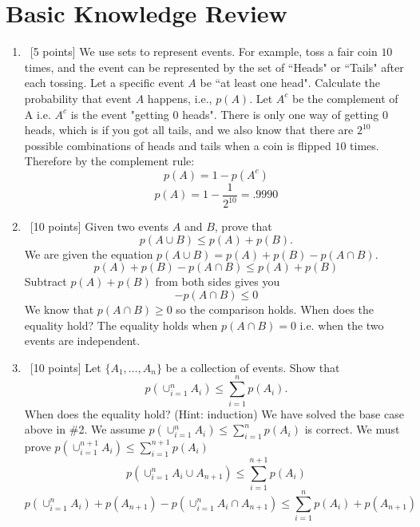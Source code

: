 \documentclass[12pt, fullpage,letterpaper]{article}
\begin{document}
\section*{Basic Knowledge Review}
\label{sec:q1}
\begin{enumerate}
\item~[5 points] We use sets to represent events. For example, toss a fair coin $10$ times, and the event can be represented by the set of ``Heads" or ``Tails" after each tossing. Let a specific event $A$ be ``at least one head". Calculate the probability that event $A$ happens, i.e., $p(A)$.
\newline\newline
Let $A^c$ be the complement of A i.e. $A^c$ is the event "getting 0 heads".  There is only one way of getting 0 heads, which is if you got all tails, and we also know that there are $2^{10}$ possible combinations of heads and tails when a coin is flipped $10$ times.  Therefore by the complement rule:\newline
\[p(A) = 1 - p(A^c)\]\newline
\[p(A) = 1 - \frac{1}{2^{10}} = .9990\]
\newline
\newline
\item~[10 points] Given two events $A$ and $B$, prove that 
\[
p(A \cup B) \le p(A) + p(B).
\]
\newline
We are given the equation $p(A \cup B) = p(A) + p(B) - p(A \cap B)$. \[
p(A) + p(B) - p(A \cap B) \le p(A) + p(B)
\]
Subtract $p(A) + p(B)$ from both sides gives you
\[
-p(A \cap B) \le 0
\]
We know that $p(A \cap B) \ge 0$ so the comparison holds.
\newline\newline
When does the equality hold?\newline\newline
The equality holds when $p(A \cap B) = 0$ i.e. when the two events are independent.
\item~[10 points] Let $\{A_1, \ldots, A_n\}$ be a collection of events. Show that
\[
p(\cup_{i=1}^n A_i) \le \sum_{i=1}^n p(A_i).
\]
When does the equality hold? (Hint: induction)\newline\newline
We have solved the base case above in \#2.  We assume $p(\cup_{i=1}^n A_i) \le \sum_{i=1}^n p(A_i)$ is correct.  We must prove $p(\cup_{i=1}^{n+1} A_i) \le \sum_{i=1}^{n+1} p(A_i)$
\[p(\cup_{i=1}^n A_i \cup A_{n+1}) \le \sum_{i=1}^{n+1} p(A_i)\]
\[p(\cup_{i=1}^n A_i) + p(A_{n+1}) - p(\cup_{i=1}^n A_i \cap A_{n+1}) \le \sum_{i=1}^n p(A_i) + p(A_{n+1})\]

\end{enumerate}
\end{document}
